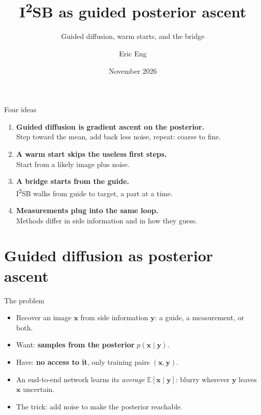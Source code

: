 \documentclass[aspectratio=169, 11pt]{beamer}
\title{I\textsuperscript{2}SB as guided posterior ascent}
\subtitle{Guided diffusion, warm starts, and the bridge}
\author{Eric Eng}
\date{November 2026}
\newcommand{\x}{\bm{x}}
\newcommand{\y}{\bm{y}}
\newcommand{\E}{\mathbb{E}}
\begin{document}
\maketitle

\begin{frame}{Four ideas}
\begin{enumerate}
  \setlength{\itemsep}{7pt}
  \item \textbf{Guided diffusion is gradient ascent on the posterior.}\\
        Step toward the mean, add back less noise, repeat: coarse to fine.
  \item \textbf{A warm start skips the useless first steps.}\\
        Start from a likely image plus noise.
  \item \textbf{A bridge starts from the guide.}\\
        I\textsuperscript{2}SB walks from guide to target, a part at a time.
  \item \textbf{Measurements plug into the same loop.}\\
        Methods differ in side information and in how they guess.
\end{enumerate}
\end{frame}

\section{Guided diffusion as posterior ascent}

\begin{frame}{The problem}
\begin{itemize}
  \setlength{\itemsep}{8pt}
  \item Recover an image $\x$ from \alert{side information} $\y$: a guide, a measurement, or
        both.
  \item Want: \textbf{samples from the posterior} $p(\x\mid\y)$.
  \item Have: \textbf{no access to it}, only training pairs $(\x,\y)$.
  \item An end-to-end network learns its \emph{average} $\E[\x\mid\y]$: blurry wherever $\y$
        leaves $\x$ uncertain.
  \item The trick: add noise to make the posterior reachable.
\end{itemize}
\end{frame}
\end{document}
